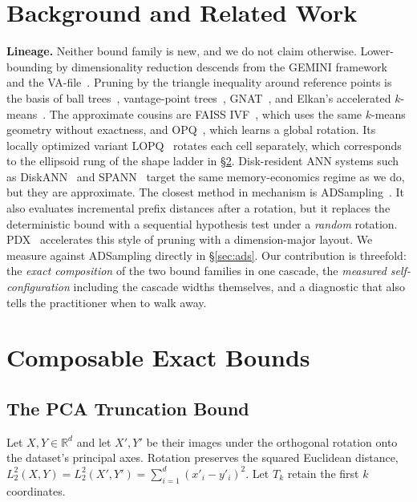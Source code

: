 \documentclass[sigconf, nonacm]{acmart}
\begin{document}
\section{Background and Related Work}

\textbf{Lineage.} Neither bound family is new, and we do not claim
otherwise. Lower-bounding by dimensionality reduction descends from the
GEMINI framework~\cite{gemini} and the VA-file~\cite{vafile}. Pruning by
the triangle inequality around reference points is the basis of ball
trees~\cite{balltree}, vantage-point trees~\cite{vptree},
GNAT~\cite{gnat}, and Elkan's accelerated $k$-means~\cite{elkan}. The
approximate cousins are FAISS IVF~\cite{faiss}, which uses the same
$k$-means geometry without exactness, and OPQ~\cite{opq}, which learns a
global rotation. Its locally optimized variant LOPQ~\cite{lopq} rotates
each cell separately, which corresponds to the ellipsoid rung of the shape
ladder in \S\ref{sec:theory}. Disk-resident ANN systems such as
DiskANN~\cite{diskann} and SPANN~\cite{spann} target the same
memory-economics regime as we do, but they are approximate. The closest
method in mechanism is ADSampling~\cite{adsampling}. It also evaluates
incremental prefix distances after a rotation, but it replaces the
deterministic bound with a sequential hypothesis test under a
\emph{random} rotation. PDX~\cite{pdx} accelerates this style of pruning
with a dimension-major layout. We
measure against ADSampling directly in \S\ref{sec:ads}. Our contribution
is threefold: the \emph{exact composition} of the two bound families in
one cascade, the \emph{measured self-configuration} including the cascade
widths themselves, and a diagnostic that also tells the practitioner when
to walk away.

\section{Composable Exact Bounds}
\label{sec:theory}

\subsection{The PCA Truncation Bound}
\label{sec:pca}

Let $X, Y \in \mathbb{R}^d$ and let $X', Y'$ be their images under the
orthogonal rotation onto the dataset's principal axes. Rotation preserves
the squared Euclidean distance,
$L_2^2(X, Y) = L_2^2(X', Y') = \sum_{i=1}^{d} (x'_i - y'_i)^2$.
Let $T_k$ retain the first $k$ coordinates.
\end{document}
